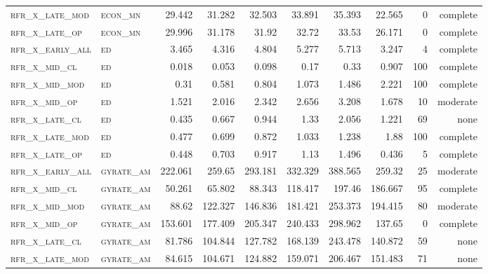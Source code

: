 \begin{landscape}
\begin{center}
\begin{footnotesize}
\begin{longtable}{llrrrrr|rrr}
\textsc{rfr\_x\_late\_mod } & \textsc{econ\_mn  }   & 29.442  & 31.282  & 32.503   & 33.891   & 35.393   & 22.565  & 0   & complete \\
\textsc{rfr\_x\_late\_op  } & \textsc{econ\_mn  }   & 29.996  & 31.178  & 31.92    & 32.72    & 33.53    & 26.171  & 0   & complete \\
\textsc{rfr\_x\_early\_all} & \textsc{ed        }   & 3.465   & 4.316   & 4.804    & 5.277    & 5.713    & 3.247   & 4   & complete \\
\textsc{rfr\_x\_mid\_cl   } & \textsc{ed        }   & 0.018   & 0.053   & 0.098    & 0.17     & 0.33     & 0.907   & 100 & complete \\
\textsc{rfr\_x\_mid\_mod  } & \textsc{ed        }   & 0.31    & 0.581   & 0.804    & 1.073    & 1.486    & 2.221   & 100 & complete \\
\textsc{rfr\_x\_mid\_op   } & \textsc{ed        }   & 1.521   & 2.016   & 2.342    & 2.656    & 3.208    & 1.678   & 10  & moderate \\
\textsc{rfr\_x\_late\_cl  } & \textsc{ed        }   & 0.435   & 0.667   & 0.944    & 1.33     & 2.056    & 1.221   & 69  & none     \\
\textsc{rfr\_x\_late\_mod } & \textsc{ed        }   & 0.477   & 0.699   & 0.872    & 1.033    & 1.238    & 1.88    & 100 & complete \\
\textsc{rfr\_x\_late\_op  } & \textsc{ed        }   & 0.448   & 0.703   & 0.917    & 1.13     & 1.496    & 0.436   & 5   & complete \\
\textsc{rfr\_x\_early\_all} & \textsc{gyrate\_am}   & 222.061 & 259.65  & 293.181  & 332.329  & 388.565  & 259.32  & 25  & moderate \\
\textsc{rfr\_x\_mid\_cl   } & \textsc{gyrate\_am}   & 50.261  & 65.802  & 88.343   & 118.417  & 197.46   & 186.667 & 95  & complete \\
\textsc{rfr\_x\_mid\_mod  } & \textsc{gyrate\_am}   & 88.62   & 122.327 & 146.836  & 181.421  & 253.373  & 194.415 & 80  & moderate \\
\textsc{rfr\_x\_mid\_op   } & \textsc{gyrate\_am}   & 153.601 & 177.409 & 205.347  & 240.433  & 298.962  & 137.65  & 0   & complete \\
\textsc{rfr\_x\_late\_cl  } & \textsc{gyrate\_am}   & 81.786  & 104.844 & 127.782  & 168.139  & 243.478  & 140.872 & 59  & none     \\
\textsc{rfr\_x\_late\_mod } & \textsc{gyrate\_am}   & 84.615  & 104.671 & 124.882  & 159.071  & 206.467  & 151.483 & 71  & none     \\

\end{longtable}
\end{footnotesize}
\end{center}
\end{landscape}
